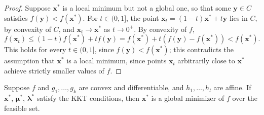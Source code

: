 \begin{proof}
Suppose $\mathbf{x}^*$ is a local minimum but not a global one, so that some $\mathbf{y} \in C$ satisfies $f(\mathbf{y}) < f(\mathbf{x}^*)$. For $t \in (0,1]$, the point $\mathbf{x}_t = (1-t)\mathbf{x}^* + t\mathbf{y}$ lies in $C$, by convexity of $C$, and $\mathbf{x}_t \to \mathbf{x}^*$ as $t \to 0^+$. By convexity of $f$,
\[
f(\mathbf{x}_t) \leq (1-t)f(\mathbf{x}^*) + t f(\mathbf{y}) = f(\mathbf{x}^*) + t(f(\mathbf{y})-f(\mathbf{x}^*)) < f(\mathbf{x}^*).
\]
This holds for every $t \in (0,1]$, since $f(\mathbf{y}) < f(\mathbf{x}^*)$; this contradicts the assumption that $\mathbf{x}^*$ is a local minimum, since points $\mathbf{x}_t$ arbitrarily close to $\mathbf{x}^*$ achieve strictly smaller values of $f$.
\end{proof}

\begin{theorem}
Suppose $f$ and $g_1, \dots, g_k$ are convex and differentiable, and $h_1, \dots, h_l$ are affine. If $\mathbf{x}^*$, $\boldsymbol{\mu}^*$, $\boldsymbol{\lambda}^*$ satisfy the KKT conditions, then $\mathbf{x}^*$ is a global minimizer of $f$ over the feasible set.
\end{theorem}

